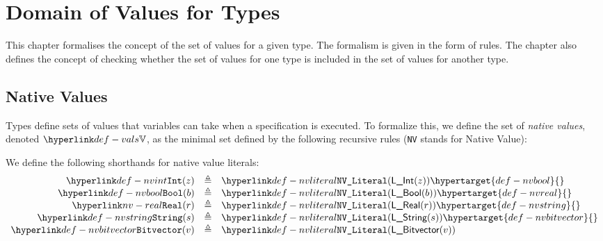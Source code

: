 \documentclass{book}
\begin{document}
\chapter{Domain of Values for Types}
This chapter formalises the concept of the set of values for a given type.
The formalism is given in the form of rules.
%
The chapter also defines the concept of checking whether the set of values
for one type is included in the set of values for another type.

\hypertarget{def-vals}{}
\section{Native Values \label{sec:nativevalues}}

Types define sets of values that variables can take when a specification is executed.
To formalize this, we define the set of \emph{native values}, denoted $\vals$,
as the minimal set defined by the following recursive rules (\texttt{NV} stands for Native Value):
\hypertarget{def-nvliteral}{}
\hypertarget{def-nvvector}{}
\hypertarget{def-nvrecord}{}

We define the following shorthands for native value literals:
\hypertarget{def-nvint}{}
\[
\begin{array}{rcl}
\nvint(z)       &\triangleq& \nvliteral{\lint(z)}           \hypertarget{def-nvbool}{}\\
\nvbool(b)      &\triangleq& \nvliteral{\lbool(b)}          \hypertarget{def-nvreal}{}\\
\nvreal(r)      &\triangleq& \nvliteral{\lreal(r)}          \hypertarget{def-nvstring}{}\\
\nvstring(s)    &\triangleq& \nvliteral{\lstring(s)}        \hypertarget{def-nvbitvector}{}\\
\nvbitvector(v) &\triangleq& \nvliteral{\lbitvector(v)}\\
\end{array}
\]
\end{document}
